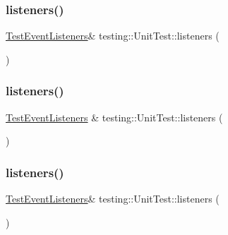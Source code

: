 \subsubsection{\texorpdfstring{listeners()}{listeners()}\hspace{0.1cm}{\footnotesize\ttfamily [1/3]}}
{\footnotesize\ttfamily \mbox{\hyperlink{classtesting_1_1_test_event_listeners}{Test\+Event\+Listeners}}\& testing\+::\+Unit\+Test\+::listeners (\begin{DoxyParamCaption}{ }\end{DoxyParamCaption})}

\mbox{\label{classtesting_1_1_unit_test_aac10085cf7c0d1751306db10cdd953cb}} 
\subsubsection{\texorpdfstring{listeners()}{listeners()}\hspace{0.1cm}{\footnotesize\ttfamily [2/3]}}
{\footnotesize\ttfamily \mbox{\hyperlink{classtesting_1_1_test_event_listeners}{Test\+Event\+Listeners}} \& testing\+::\+Unit\+Test\+::listeners (\begin{DoxyParamCaption}{ }\end{DoxyParamCaption})}

\mbox{\label{classtesting_1_1_unit_test_a1b7387b0b3daa2433ed6b685027bf285}} 
\subsubsection{\texorpdfstring{listeners()}{listeners()}\hspace{0.1cm}{\footnotesize\ttfamily [3/3]}}
{\footnotesize\ttfamily \mbox{\hyperlink{classtesting_1_1_test_event_listeners}{Test\+Event\+Listeners}}\& testing\+::\+Unit\+Test\+::listeners (\begin{DoxyParamCaption}{ }\end{DoxyParamCaption})}

\mbox{\label{classtesting_1_1_unit_test_af35839566385e14f6b31232489112621}} 
